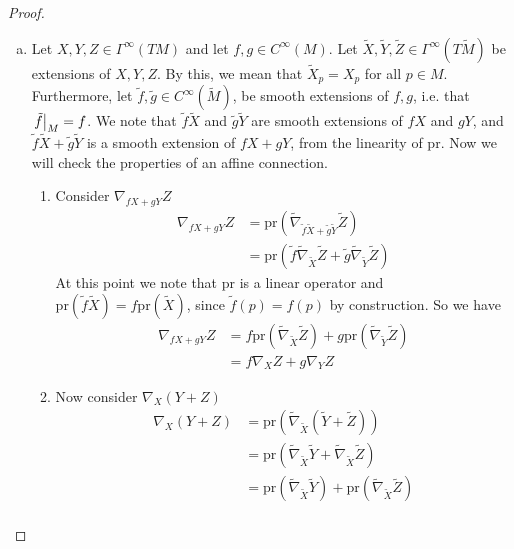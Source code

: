 \documentclass[a4paper]{article}
\begin{document}
\begin{proof}
  \begin{enumerate}[(a)]
    \item Let $X,Y,Z \in \Gamma^{\infty}(TM)$ and let $f,g \in C^{\infty}(M)$. Let $\tilde{X}, \tilde{Y}, \tilde{Z} \in \Gamma^{\infty}(T\tilde{M})$ be extensions of $X,Y,Z$. By this, we mean that $\tilde{X}_p = X_p$ for all $p \in M$. Furthermore, let $\tilde{f}, \tilde{g} \in C^{\infty}(\tilde{M})$, be smooth extensions of $f,g$, i.e. that $\eval{\tilde{f}}_M = f$. We note that $\tilde{f}\tilde{X}$ and $\tilde{g}\tilde{Y}$ are smooth extensions of $fX$ and $gY$, and $\tilde{f}\tilde{X} + \tilde{g}\tilde{Y}$ is a smooth extension of $fX + gY$, from the linearity of $\text{pr}$. Now we will check the properties of an affine connection.
      \begin{enumerate}[1.]
        \item Consider $\nabla_{fX + gY}Z$
          \[
            \begin{aligned}
              \nabla_{fX + gY}Z &= \text{pr} \left( \tilde{\nabla}_{\tilde{f}\tilde{X} + \tilde{g}\tilde{Y}}\tilde{Z}\right) \\
                                &= \text{pr} \left( \tilde{f} \tilde{\nabla}_{\tilde{X}}\tilde{Z} + \tilde{g} \tilde{\nabla}_{\tilde{Y}}\tilde{Z}  \right)
            \end{aligned}
          \]
          At this point we note that $\text{pr}$ is a linear operator and $\text{pr} \left( \tilde{f} \tilde{X} \right) = f \text{pr} \left( \tilde{X} \right)$, since $\tilde{f}(p) = f(p)$ by construction. So we have
          \[
            \begin{aligned}
              \nabla_{fX + gY}Z &= f \text{pr} \left( \tilde{\nabla}_{\tilde{X}}\tilde{Z} \right) + g\text{pr} \left( \tilde{\nabla}_{\tilde{Y}}\tilde{Z} \right) \\
                                &= f \nabla_{X}Z + g \nabla_{Y}Z
            \end{aligned}
          \]
        \item  Now consider $\nabla_{X}(Y+Z)$
          \[
            \begin{aligned}
              \nabla_{X}(Y+Z) &= \text{pr} \left( \tilde{\nabla}_{\tilde{X}} (\tilde{Y} + \tilde{Z}) \right) \\
                              &= \text{pr} \left( \tilde{\nabla}_{\tilde{X}} \tilde{Y} + \tilde{\nabla}_{\tilde{X}} \tilde{Z} \right) \\
                              &= \text{pr} \left(\tilde{\nabla}_{\tilde{X}} \tilde{Y}\right) + \text{pr} \left( \tilde{\nabla}_{\tilde{X}} \tilde{Z}\right) \\

\end{aligned}\]
\end{enumerate}
\end{enumerate}
\end{proof}
\end{document}
